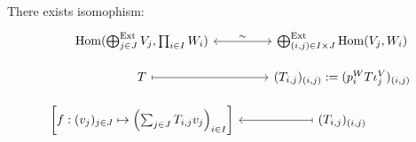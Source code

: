 \begin{proposition}
    There exists isomophism: 
    \[
        \begin{tikzcd}[row sep=small]
            \Hom(\bigoplus^{\Ext}_{j \in J}V_j, \prod_{i \in I}W_i) \arrow[leftrightarrow, r, "\sim"]
            & \bigoplus^{\Ext}_{(i, j) \in I \times J} \Hom(V_j, W_i) \\
            T  \arrow[mapsto, r]
            & (T_{i,j})_{(i, j)} := (p_i^{W} T \iota_j^{V})_{(i, j)} \\
            \left[ f: (v_j)_{j \in J} \mapsto \left( \sum_{j \in J} T_{i, j} v_j \right)_{i \in I} \right]
            & (T_{i,j})_{(i, j)} \arrow[mapsto, l]
        \end{tikzcd}
    \]
\end{proposition}

